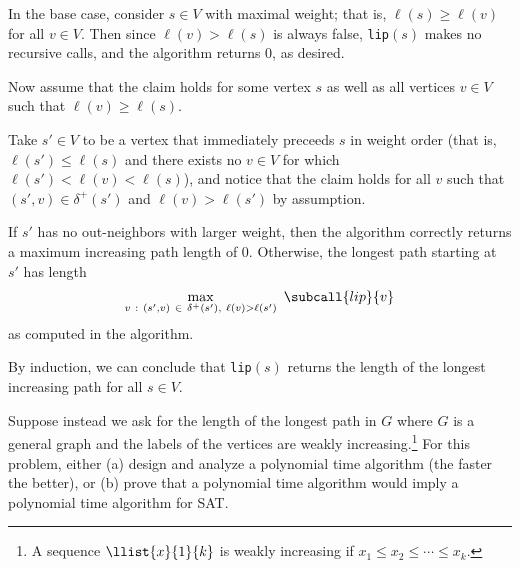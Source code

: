 \documentclass{article}
\begin{document}
\begin{solution}
\begin{subproof}[Correctness]
In the base case, consider $s \in V$ with maximal weight; that is, $\ell(s) \geq \ell(v)$ for all $v \in V$. Then since $\ell(v) > \ell(s)$ is always false, \texttt{lip}$(s)$ makes no recursive calls, and the algorithm returns 0, as desired.

Now assume that the claim holds for some vertex $s$ as well as all vertices $v \in V$ such that $\ell(v) \geq \ell(s)$.

Take $s' \in V$ to be a vertex that immediately preceeds $s$ in weight order (that is, $\ell(s') \leq \ell(s)$ and there exists no $v \in V$ for which $\ell(s') < \ell(v) < \ell(s)$), and notice that the claim holds for all $v$ such that $(s',v) \in \delta^{+}(s')$ and $\ell(v) > \ell(s')$ by assumption.

If $s'$ has no out-neighbors with larger weight, then the algorithm correctly returns a maximum increasing path length of 0. Otherwise, the longest path starting at $s'$ has length
\begin{align*}
    \max_{v \ : \ (s',v) \ \in \ \delta^{+}(s'), \ \ell(v) > \ell(s')}  \ \subcall{lip}{v}
\end{align*}
as computed in the algorithm.

By induction, we can conclude that \texttt{lip}$(s)$ returns the length of the longest increasing path for all $s \in V$.
\end{subproof}
\end{solution}
\pagebreak






\begin{subexercise}
  Suppose instead we ask for the length of the longest path in $G$ where $G$ is a general graph and the labels of the vertices are weakly increasing.\footnote[4]{A sequence $ \llist{x}{1}{k} $ is weakly increasing if $ x_1\leq x_2\leq \cdots\leq x_k $.}
  For this problem, either (a) design and analyze a polynomial time algorithm (the faster the better), or (b) prove that a polynomial time algorithm would imply a polynomial time algorithm for SAT.
\end{subexercise}
\end{document}
